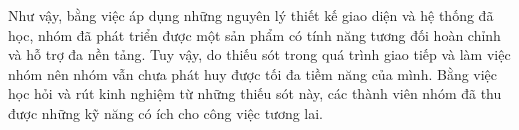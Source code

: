\documentclass[./../main.tex]{subfiles}
\begin{document}
Như vậy, bằng việc áp dụng những nguyên lý thiết kế giao diện và hệ thống đã học, nhóm đã phát triển được một sản phẩm có
tính năng tương đối hoàn chỉnh và hỗ trợ đa nền tảng. Tuy vậy, do thiếu sót trong quá trình giao tiếp và làm việc nhóm
 nên nhóm vẫn chưa phát huy được tối đa tiềm năng của mình. Bằng việc học hỏi và rút kinh nghiệm từ những thiếu sót này,
  các thành viên nhóm đã thu được những kỹ năng có ích cho công việc tương lai.
\end{document}
